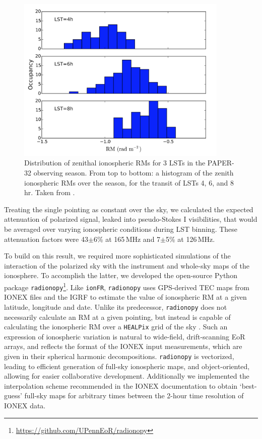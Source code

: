 \begin{figure}
\centering
\includegraphics[width=0.9\textwidth]{chapters/ionosphere/figures/MooreHist.png}
\caption[Distribution of zenithal ionospheric RMs for 3 LSTs in the PAPER-32 observing season]{Distribution of zenithal ionospheric RMs for 3 LSTs in the PAPER-32 observing season. From top to bottom: a histogram of the zenith ionospheric RMs over the season, for the transit of LSTs 4, 6, and 8 hr. Taken from \cite{Moore.17}.}
\label{fig:ionosphere_psa32hist}
\end{figure}

Treating the single pointing as constant over the sky, we calculated the expected attenuation of polarized signal, leaked into pseudo-Stokes I visibilities, that would be averaged over varying ionospheric conditions during LST binning. These attenuation factors were 43$\pm$6\% at 165\,MHz and 7$\pm$5\% at 126\,MHz.

To build on this result, we required more sophisticated simulations of the interaction of the polarized sky with the instrument and whole-sky maps of the ionosphere. To accomplish the latter, we developed the open-source Python package {\tt radionopy}\footnote{\url{https://github.com/UPennEoR/radionopy}}. Like {\tt ionFR}, {\tt radionopy} uses GPS-derived TEC maps from IONEX files and the IGRF to estimate the value of ionospheric RM at a given latitude, longitude and date. Unlike its predecessor, {\tt radionopy} does not necessarily calculate an RM at a given pointing, but instead is capable of calculating the ionospheric RM over a {\tt HEALPix} grid of the sky \citep{healpix}. Such an expression of ionospheric variation is natural to wide-field, drift-scanning EoR arrays, and reflects the format of the IONEX input measurements, which are given in their spherical harmonic decompositions. {\tt radionopy} is vectorized, leading to efficient generation of full-sky ionospheric maps, and object-oriented, allowing for easier collaborative development. Additionally we implemented the interpolation scheme recommended in the IONEX documentation to obtain `best-guess' full-sky maps for arbitrary times between the 2-hour time resolution of IONEX data. 

